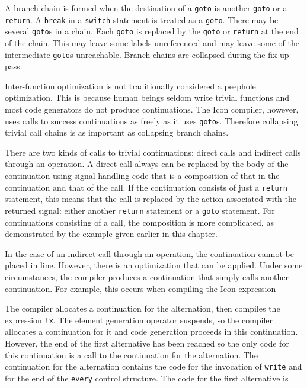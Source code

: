 A branch chain is formed when the destination of a \texttt{goto} is
another \texttt{goto} or a \texttt{return}. A \texttt{break} in a
\texttt{switch} statement is treated as a \texttt{goto}. There may be
several \texttt{goto}s in a chain. Each \texttt{goto} is replaced by
the \texttt{goto} or \texttt{return} at the end of the chain. This may
leave some labels unreferenced and may leave some of the intermediate
\texttt{goto}s unreachable. Branch chains are collapsed during the
fix-up pass.

Inter-function optimization is not traditionally considered a peephole
optimization. This is because human beings seldom write trivial
functions and most code generators do not produce continuations. The
Icon compiler, however, uses calls to success continuations as freely
as it uses \texttt{goto}s. Therefore collapsing trivial call chains is
as important as collapsing branch chains.

There are two kinds of calls to trivial continuations: direct calls
and indirect calls through an operation. A direct call always can be
replaced by the body of the continuation using signal handling code
that is a composition of that in the continuation and that of the
call. If the continuation consists of just a \texttt{return}
statement, this means that the call is replaced by the action
associated with the returned signal: either another \texttt{return}
statement or a \texttt{goto} statement. For continuations consisting
of a call, the composition is more complicated, as demonstrated by the
example given earlier in this chapter.

In the case of an indirect call through an operation, the continuation
cannot be placed in line. However, there is an optimization that can
be applied. Under some circumstances, the compiler produces a
continuation that simply calls another continuation. For example, this
occurs when compiling the Icon expression


The compiler allocates a continuation for the alternation, then
compiles the expression \texttt{!x}. The element generation operator
suspends, so the compiler allocates a continuation for it and code
generation proceeds in this continuation.  However, the end of the
first alternative has been reached so the only code for this
continuation is a call to the continuation for the alternation. The
continuation for the alternation contains the code for the invocation
of \texttt{write} and for the end of the \texttt{every} control
structure. The code for the first alternative is

